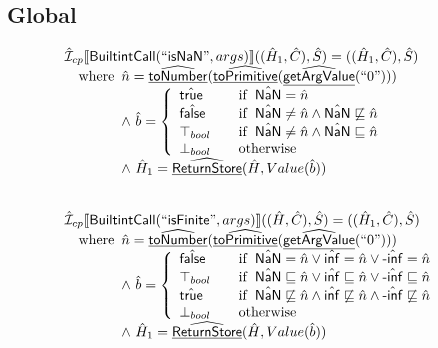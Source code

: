 \subsection{Global}
\[
\begin{array}{l}
\aI _{cp}\lbr \SF{BuiltintCall}(``\SF{isNaN}",args)\rbr((\hat{H}_1,\hat{C}), \hat{S})
  = ((\hat{H}_1, \hat{C}), \hat{S})\\
\quad\wherec{
  \hat{n} = \ahf{toNumber}(\ahf{toPrimitive}(\ahf{getArgValue}(``0")))\\
  \land\ \hat{b} =
    \left\{\begin{array}{l@{\quad\quad}l}
      \atrue & \ifc{\hat{\SF{NaN}} = \hat{n}} \\
      \afalse & \ifc{\hat{\SF{NaN}} \neq \hat{n} \land \hat{\SF{NaN}} \not\sqsubseteq \hat{n}} \\
      \top_{bool} & \ifc{\hat{\SF{NaN}} \neq \hat{n} \land \hat{\SF{NaN}} \sqsubseteq \hat{n}} \\
      \bot_{bool} & \owc \\
    \end{array}\right.\\
  \land\ \hat{H}_1 = \ahf{ReturnStore}(\hat{H}, Value(\hat{b}))\\
  }\\
\\\\


\aI _{cp}\lbr \SF{BuiltintCall}(``\SF{isFinite}",args)\rbr((\hat{H},\hat{C}), \hat{S})
  = ((\hat{H}_1, \hat{C}), \hat{S})\\
\quad\wherec{
  \hat{n} = \ahf{toNumber}(\ahf{toPrimitive}(\ahf{getArgValue}(``0")))\\
  \land\ \hat{b} =
    \left\{\begin{array}{l@{\quad\quad}l}
      \afalse & \ifc{\hat{\SF{NaN}} = \hat{n} \lor \hat{\SF{inf}} = \hat{n} \lor \hat{\SF{-inf}} = \hat{n}}\\
      \top_{bool} & \ifc{\hat{\SF{NaN}} \sqsubseteq \hat{n}
          \lor \hat{\SF{inf}} \sqsubseteq \hat{n} \lor \hat{\SF{-inf}} \sqsubseteq \hat{n}}\\
      \atrue & \ifc{\hat{\SF{NaN}} \not\sqsubseteq \hat{n}
          \land \hat{\SF{inf}} \not\sqsubseteq \hat{n} \land \hat{\SF{-inf}} \not\sqsubseteq \hat{n}} \\
      \bot_{bool} & \owc \\
    \end{array}\right.\\
  \land\ \hat{H}_1 = \ahf{ReturnStore}(\hat{H}, Value(\hat{b}))\\
  }\\
\\\\  

\end{array}
\]


